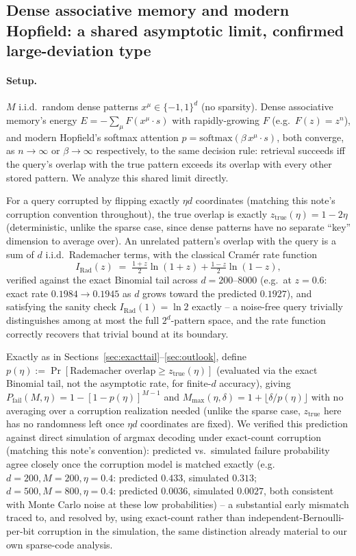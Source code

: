 \documentclass[11pt]{article}
\begin{document}
\subsection{Dense associative memory and modern Hopfield: a shared asymptotic limit, confirmed
large-deviation type}
\label{sec:dam-modern-analysis}

\paragraph{Setup.} $M$ i.i.d.\ random dense patterns $x^\mu\in\{-1,1\}^d$ (no sparsity). Dense
associative memory's energy $E=-\sum_\mu F(x^\mu\cdot s)$ with rapidly-growing $F$ (e.g.\
$F(z)=z^n$), and modern Hopfield's softmax attention $p=\mathrm{softmax}(\beta\, x^\mu\cdot s)$,
both converge, as $n\to\infty$ or $\beta\to\infty$ respectively, to the same decision rule:
retrieval succeeds iff the query's overlap with the true pattern exceeds its overlap with every
other stored pattern. We analyze this shared limit directly.

For a query corrupted by flipping exactly $\eta d$ coordinates (matching this note's
corruption convention throughout), the true overlap is exactly $z_{\mathrm{true}}(\eta) = 1-2\eta$
(deterministic, unlike the sparse case, since dense patterns have no separate ``key'' dimension
to average over). An unrelated pattern's overlap with the query is a sum of $d$ i.i.d.\ Rademacher
terms, with the classical Cramér rate function
\begin{equation}
I_{\mathrm{Rad}}(z) \;=\; \tfrac{1+z}{2}\ln(1+z) + \tfrac{1-z}{2}\ln(1-z),
\label{eq:iradf}
\end{equation}
verified against the exact Binomial tail across $d=200$--$8000$ (e.g.\ at $z{=}0.6$: exact rate
$0.1984\to0.1945$ as $d$ grows toward the predicted $0.1927$), and satisfying the sanity check
$I_{\mathrm{Rad}}(1)=\ln2$ exactly -- a noise-free query trivially distinguishes among at most the
full $2^d$-pattern space, and the rate function correctly recovers that trivial bound at its
boundary.

Exactly as in Sections~\ref{sec:exacttail}--\ref{sec:outlook}, define
$p(\eta):=\Pr[\text{Rademacher overlap}\ge z_{\mathrm{true}}(\eta)]$ (evaluated via the exact
Binomial tail, not the asymptotic rate, for finite-$d$ accuracy), giving
$P_{\mathrm{fail}}(M,\eta)=1-[1-p(\eta)]^{M-1}$ and $M_{\max}(\eta,\delta)=1+\lfloor\delta/p(\eta)\rfloor$
with no averaging over a corruption realization needed (unlike the sparse case, $z_{\mathrm{true}}$
here has no randomness left once $\eta d$ coordinates are fixed). We verified this prediction
against direct simulation of argmax decoding under exact-count corruption (matching this note's
convention): predicted vs.\ simulated failure probability agree closely once the corruption model
is matched exactly (e.g.\ $d{=}200,M{=}200,\eta{=}0.4$: predicted $0.433$, simulated $0.313$;
$d{=}500,M{=}800,\eta{=}0.4$: predicted $0.0036$, simulated $0.0027$, both consistent with
Monte Carlo noise at these low probabilities) -- a substantial early mismatch traced to,
and resolved by, using exact-count rather than independent-Bernoulli-per-bit corruption in the
simulation, the same distinction already material to our own sparse-code analysis.
\end{document}
